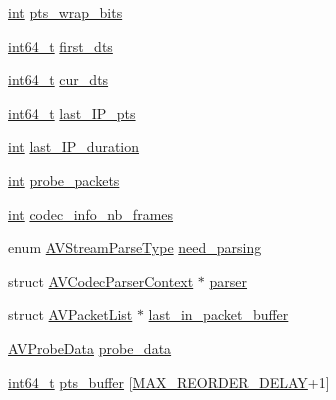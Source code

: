 \begin{DoxyCompactItemize}
\begin{tabbing}
\end{tabbing}\item 
\hyperlink{xmltok_8h_a5a0d4a5641ce434f1d23533f2b2e6653}{int} \hyperlink{struct_a_v_stream_a6cdb0c90a69899f4e1e54704bb654936}{pts\+\_\+wrap\+\_\+bits}
\item 
\hyperlink{lib-src_2ffmpeg_2win32_2stdint_8h_a67a9885ef4908cb72ce26d75b694386c}{int64\+\_\+t} \hyperlink{struct_a_v_stream_a1e341587fa92b173a0d6ae73fadb0409}{first\+\_\+dts}
\item 
\hyperlink{lib-src_2ffmpeg_2win32_2stdint_8h_a67a9885ef4908cb72ce26d75b694386c}{int64\+\_\+t} \hyperlink{struct_a_v_stream_ad552f602c2113bd5152cff3c58ba1f9f}{cur\+\_\+dts}
\item 
\hyperlink{lib-src_2ffmpeg_2win32_2stdint_8h_a67a9885ef4908cb72ce26d75b694386c}{int64\+\_\+t} \hyperlink{struct_a_v_stream_af8e7b1373292e393ed210dc15aa8d2ca}{last\+\_\+\+I\+P\+\_\+pts}
\item 
\hyperlink{xmltok_8h_a5a0d4a5641ce434f1d23533f2b2e6653}{int} \hyperlink{struct_a_v_stream_a5764343a4d348f453933bf73c26f84c3}{last\+\_\+\+I\+P\+\_\+duration}
\item 
\hyperlink{xmltok_8h_a5a0d4a5641ce434f1d23533f2b2e6653}{int} \hyperlink{struct_a_v_stream_a1cd124860be31d0d275bb838ace6a98c}{probe\+\_\+packets}
\item 
\hyperlink{xmltok_8h_a5a0d4a5641ce434f1d23533f2b2e6653}{int} \hyperlink{struct_a_v_stream_adc161a5c5773d42cea315a5ad0454cf2}{codec\+\_\+info\+\_\+nb\+\_\+frames}
\item 
enum \hyperlink{avformat_8h_afacbc85f23a50771e3801bda0a353d91}{A\+V\+Stream\+Parse\+Type} \hyperlink{struct_a_v_stream_acd70b72d0c0514643a5c11b2c7c8202c}{need\+\_\+parsing}
\item 
struct \hyperlink{struct_a_v_codec_parser_context}{A\+V\+Codec\+Parser\+Context} $\ast$ \hyperlink{struct_a_v_stream_a5b1079c1e244d644a86457e7e27545c1}{parser}
\item 
struct \hyperlink{struct_a_v_packet_list}{A\+V\+Packet\+List} $\ast$ \hyperlink{struct_a_v_stream_ab8d53bc29f0761a3f87ec0b5ed7dc8d4}{last\+\_\+in\+\_\+packet\+\_\+buffer}
\item 
\hyperlink{struct_a_v_probe_data}{A\+V\+Probe\+Data} \hyperlink{struct_a_v_stream_a9749c451ce3c41a2345933252c4f96c6}{probe\+\_\+data}
\item 
\hyperlink{lib-src_2ffmpeg_2win32_2stdint_8h_a67a9885ef4908cb72ce26d75b694386c}{int64\+\_\+t} \hyperlink{struct_a_v_stream_ac13a11eddbc6618f2a7cb66b75f6eb68}{pts\+\_\+buffer} \mbox{[}\hyperlink{avformat_8h_a1a5362deb573c857ad801ec212ef3583}{M\+A\+X\+\_\+\+R\+E\+O\+R\+D\+E\+R\+\_\+\+D\+E\+L\+AY}+1\mbox{]}

\end{DoxyCompactItemize}
